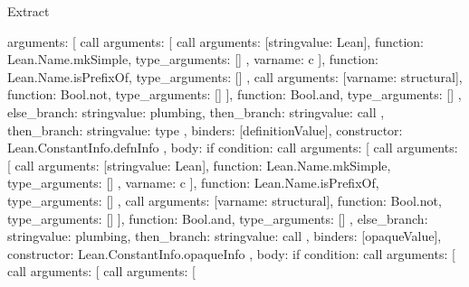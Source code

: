 \begin{lexlean}{Extract}
\begin{toolingmodule}
{{{{{{{{{                      arguments: [
                        call{
                          arguments: [
                            call{
                              arguments: [string{value: Lean}],
                              function: Lean.Name.mkSimple,
                              type_arguments: []
                            },
                            var{name: c}
                          ],
                          function: Lean.Name.isPrefixOf,
                          type_arguments: []
                        },
                        call{
                          arguments: [var{name: structural}],
                          function: Bool.not,
                          type_arguments: []
                        }
                      ],
                      function: Bool.and,
                      type_arguments: []
                    },
                    else_branch: string{value: plumbing},
                    then_branch: string{value: call}
                  },
                  then_branch: string{value: type}
                },
                binders: [definitionValue],
                constructor: Lean.ConstantInfo.defnInfo
              },
              {
                body: if{
                  condition: call{
                    arguments: [
                      call{
                        arguments: [
                          call{
                            arguments: [string{value: Lean}],
                            function: Lean.Name.mkSimple,
                            type_arguments: []
                          },
                          var{name: c}
                        ],
                        function: Lean.Name.isPrefixOf,
                        type_arguments: []
                      },
                      call{
                        arguments: [var{name: structural}],
                        function: Bool.not,
                        type_arguments: []
                      }
                    ],
                    function: Bool.and,
                    type_arguments: []
                  },
                  else_branch: string{value: plumbing},
                  then_branch: string{value: call}
                },
                binders: [opaqueValue],
                constructor: Lean.ConstantInfo.opaqueInfo
              },
              {
                body: if{
                  condition: call{
                    arguments: [
                      call{
                        arguments: [
                          call{
                            arguments: [
}}}}}}}}}}
\end{toolingmodule}
\end{lexlean}
